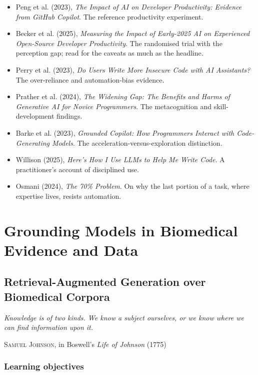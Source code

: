 \documentclass[
  letterpaper,
  11pt]{scrbook}
\providecommand{\tightlist}{%
  \setlength{\itemsep}{0pt}\setlength{\parskip}{0pt}}
\begin{document}
\begin{itemize}
\tightlist
\item
  Peng et al. (2023), \emph{The Impact of AI on Developer Productivity:
  Evidence from GitHub Copilot}. The reference productivity experiment.
\item
  Becker et al. (2025), \emph{Measuring the Impact of Early-2025 AI on
  Experienced Open-Source Developer Productivity}. The randomised trial
  with the perception gap; read for the caveats as much as the headline.
\item
  Perry et al. (2023), \emph{Do Users Write More Insecure Code with AI
  Assistants?} The over-reliance and automation-bias evidence.
\item
  {Prather et al.} (2024), \emph{The Widening Gap: The Benefits and
  Harms of Generative AI for Novice Programmers}. The metacognition and
  skill-development findings.
\item
  Barke et al. (2023), \emph{Grounded Copilot: How Programmers Interact
  with Code-Generating Models}. The acceleration-versus-exploration
  distinction.
\item
  Willison (2025), \emph{Here's How I Use LLMs to Help Me Write Code}. A
  practitioner's account of disciplined use.
\item
  Osmani (2024), \emph{The 70\% Problem}. On why the last portion of a
  task, where expertise lives, resists automation.
\end{itemize}

\part{Grounding Models in Biomedical Evidence and Data}

\chapter{Retrieval-Augmented Generation over Biomedical
Corpora}\label{sec-rag-biomedical}

\begin{flushright}\small

\emph{Knowledge is of two kinds. We know a subject ourselves, or we know
where we can find information upon it.}

\textsc{Samuel Johnson}, in Boswell's \emph{Life of Johnson} (1775)

\end{flushright}

\section{Learning objectives}\label{learning-objectives-4}
\end{document}

